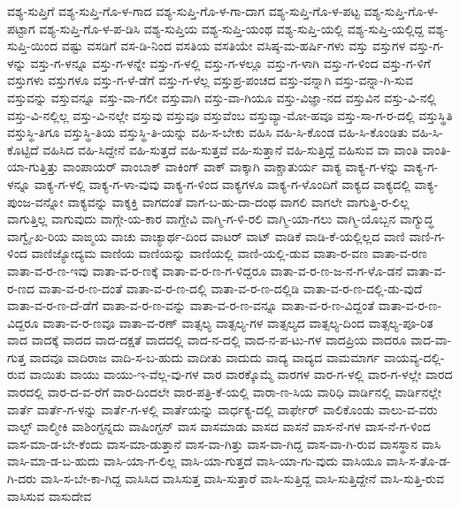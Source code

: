 {ವಶ್ಯ-ಸುಪ್ತಿಗೆ
ವಶ್ಯ-ಸುಪ್ತಿ-ಗೊ-ಳ-ಗಾದ
ವಶ್ಯ-ಸುಪ್ತಿ-ಗೊ-ಳ-ಗಾ-ದಾಗ
ವಶ್ಯ-ಸುಪ್ತಿ-ಗೊ-ಳ-ಪಟ್ಟ
ವಶ್ಯ-ಸುಪ್ತಿ-ಗೊ-ಳ-ಪಟ್ಟಾಗ
ವಶ್ಯ-ಸುಪ್ತಿ-ಗೊ-ಳ-ಪ-ಡಿಸಿ
ವಶ್ಯ-ಸುಪ್ತಿಯ
ವಶ್ಯ-ಸುಪ್ತಿ-ಯಂಥ
ವಶ್ಯ-ಸುಪ್ತಿ-ಯಲ್ಲಿ
ವಶ್ಯ-ಸುಪ್ತಿ-ಯಲ್ಲಿದ್ದ
ವಶ್ಯ-ಸುಪ್ತಿ-ಯಿಂದ
ವಷ್ಟು
ವಸಡಿಗೆ
ವಸ-ಡಿ-ನಿಂದ
ವಸತಿಯ
ವಸತಿಯೇ
ವಸಿಷ್ಠ-ಮ-ಹರ್ಷಿ-ಗಳು
ವಸ್ತು
ವಸ್ತುಗಳ
ವಸ್ತು-ಗ-ಳನ್ನು
ವಸ್ತು-ಗ-ಳನ್ನೂ
ವಸ್ತು-ಗ-ಳನ್ನೇ
ವಸ್ತು-ಗ-ಳಲ್ಲಿ
ವಸ್ತು-ಗ-ಳಲ್ಲೂ
ವಸ್ತು-ಗ-ಳಾಗಿ
ವಸ್ತು-ಗ-ಳಿಂದ
ವಸ್ತು-ಗ-ಳಿಗೆ
ವಸ್ತುಗಳು
ವಸ್ತುಗಳೂ
ವಸ್ತು-ಗ-ಳೆ-ಡೆಗೆ
ವಸ್ತು-ಗ-ಳೆಲ್ಲ
ವಸ್ತುಪ್ರ-ಪಂಚದ
ವಸ್ತು-ವನ್ನಾಗಿ
ವಸ್ತು-ವನ್ನಾ-ಗಿ-ಸುವ
ವಸ್ತುವನ್ನು
ವಸ್ತುವನ್ನೂ
ವಸ್ತು-ವಾ-ಗಲೀ
ವಸ್ತುವಾಗಿ
ವಸ್ತು-ವಾ-ಗಿಯೂ
ವಸ್ತು-ವಿಜ್ಞಾ-ನದ
ವಸ್ತುವಿನ
ವಸ್ತು-ವಿ-ನಲ್ಲಿ
ವಸ್ತು-ವಿ-ನಲ್ಲಿಲ್ಲ
ವಸ್ತು-ವಿ-ನಲ್ಲೇ
ವಸ್ತುವು
ವಸ್ತುವೂ
ವಸ್ತುವೆಂಬ
ವಸ್ತುವ್ಯಾ-ಮೋ-ಹವೂ
ವಸ್ತು-ಸಾ-ಗ-ರ-ದಲ್ಲಿ
ವಸ್ತುಸ್ಥಿತಿ
ವಸ್ತುಸ್ಥಿ-ತಿಗೂ
ವಸ್ತುಸ್ಥಿ-ತಿಯ
ವಸ್ತುಸ್ಥಿ-ತಿ-ಯನ್ನು
ವಹಿ-ಸ-ಬೇಕು
ವಹಿಸಿ
ವಹಿ-ಸಿ-ಕೊಂಡ
ವಹಿ-ಸಿ-ಕೊಂಡಿತು
ವಹಿ-ಸಿ-ಕೊಟ್ಟಿದೆ
ವಹಿಸಿದ
ವಹಿ-ಸಿದ್ದೇನೆ
ವಹಿ-ಸುತ್ತದೆ
ವಹಿ-ಸುತ್ತವೆ
ವಹಿ-ಸುತ್ತಾನೆ
ವಹಿ-ಸುತ್ತಿದ್ದೆ
ವಹಿಸುವ
ವಾ
ವಾಂತಿ
ವಾಂತಿ-ಯಾ-ಗುತ್ತಿತ್ತು
ವಾಂಪಾಯರ್
ವಾಂಬಾಕ್
ವಾಕಿಂಗ್
ವಾಕ್
ವಾಕ್ಕಾಗಿ
ವಾಕ್ಚಾತುರ್ಯ
ವಾಕ್ಯ
ವಾಕ್ಯ-ಗ-ಳನ್ನು
ವಾಕ್ಯ-ಗ-ಳನ್ನೂ
ವಾಕ್ಯ-ಗ-ಳಲ್ಲಿ
ವಾಕ್ಯ-ಗ-ಳಾ-ವುವು
ವಾಕ್ಯ-ಗ-ಳಿಂದ
ವಾಕ್ಯಗಳೂ
ವಾಕ್ಯ-ಗ-ಳೊಂದಿಗೆ
ವಾಕ್ಯದ
ವಾಕ್ಯದಲ್ಲಿ
ವಾಕ್ಯ-ಪುಂಜ-ವನ್ನೋ
ವಾಕ್ಯವನ್ನು
ವಾಕ್ಶಕ್ತಿ
ವಾಗದಂತೆ
ವಾಗ-ಬ-ಹು-ದಾ-ದಂಥ
ವಾಗಲಿ
ವಾಗಲೇ
ವಾಗುತ್ತಿ-ರ-ಲಿಲ್ಲ
ವಾಗುತ್ತಿಲ್ಲ
ವಾಗುವುದು
ವಾಗ್ಗೇ-ಯ-ಕಾರ
ವಾಗ್ದೇವಿ
ವಾಗ್ಮಿ-ಗ-ಳಿ-ರಲಿ
ವಾಗ್ಮಿ-ಯಾ-ಗಲು
ವಾಗ್ಮಿ-ಯೊಬ್ಬನ
ವಾಗ್ಯುದ್ಧ
ವಾಗ್ವೈ-ಖ-ರಿಯ
ವಾಙ್ಮಯ
ವಾಚು
ವಾಚ್ಯಾರ್ಥ-ದಿಂದ
ವಾಟರ್
ವಾಟ್
ವಾಡಿಕೆ
ವಾಡಿ-ಕೆ-ಯಲ್ಲಿಲ್ಲದ
ವಾಣಿ
ವಾಣಿ-ಗ-ಳಿಂದ
ವಾಣಿಜ್ಯೋದ್ಯಮ
ವಾಣಿಯ
ವಾಣಿಯನ್ನು
ವಾಣಿಯಲ್ಲಿ
ವಾಣಿ-ಯಲ್ಲಿ-ಡುವ
ವಾತಾ-ರ-ವಣ
ವಾತಾ-ವ-ರಣ
ವಾತಾ-ವ-ರ-ಣ-ಇವು
ವಾತಾ-ವ-ರ-ಣಕ್ಕೆ
ವಾತಾ-ವ-ರ-ಣ-ಗ-ಳಿದ್ದರೂ
ವಾತಾ-ವ-ರ-ಣ-ಜ-ನ-ಗ-ಳೊ-ಡನೆ
ವಾತಾ-ವ-ರ-ಣದ
ವಾತಾ-ವ-ರ-ಣ-ದಂತೆ
ವಾತಾ-ವ-ರ-ಣ-ದಲ್ಲಿ
ವಾತಾ-ವ-ರ-ಣ-ದಲ್ಲಿಡಿ
ವಾತಾ-ವ-ರ-ಣ-ದಲ್ಲಿ-ಡು-ವುದೆ
ವಾತಾ-ವ-ರ-ಣ-ದೆ-ಡೆಗೆ
ವಾತಾ-ವ-ರ-ಣ-ವನ್ನು
ವಾತಾ-ವ-ರ-ಣ-ವನ್ನೂ
ವಾತಾ-ವ-ರ-ಣ-ವಿದ್ದಂತೆ
ವಾತಾ-ವ-ರ-ಣ-ವಿದ್ದರೂ
ವಾತಾ-ವ-ರ-ಣವೂ
ವಾತಾ-ವ-ರಣ್
ವಾತ್ಸಲ್ಯ
ವಾತ್ಸಲ್ಯ-ಗಳ
ವಾತ್ಸಲ್ಯದ
ವಾತ್ಸಲ್ಯ-ದಿಂದ
ವಾತ್ಸಲ್ಯ-ಪೂ-ರಿತ
ವಾದ
ವಾದಕ್ಕೆ
ವಾದದ
ವಾದ-ದಕ್ಷತೆ
ವಾದದಲ್ಲಿ
ವಾದ-ನ-ದಲ್ಲಿ
ವಾದ-ನ-ಪ-ಟು-ಗಳ
ವಾದಪ್ರಿಯ
ವಾದರೂ
ವಾದ-ವಾ-ಗುತ್ತ
ವಾದವೂ
ವಾದಿರಾಜ
ವಾದಿ-ಸ-ಬ-ಹುದು
ವಾದೀತು
ವಾದುದು
ವಾದ್ಯ
ವಾದ್ಯದ
ವಾಮಮಾರ್ಗ
ವಾಯವ್ಯ-ದಲ್ಲಿ-ರುವ
ವಾಯಿತು
ವಾಯು
ವಾಯು-ಇ-ವೆಲ್ಲ-ವು-ಗಳ
ವಾರ
ವಾರಕ್ಕೊಮ್ಮೆ
ವಾರಗಳ
ವಾರ-ಗ-ಳಲ್ಲಿ
ವಾರ-ಗ-ಳಲ್ಲೇ
ವಾರದ
ವಾರದಲ್ಲಿ
ವಾರ-ದ-ವ-ರೆಗೆ
ವಾರ-ದಿಂದಲೇ
ವಾರ-ಪತ್ರಿ-ಕೆ-ಯಲ್ಲಿ
ವಾರಾ-ಣ-ಸಿಯ
ವಾರಿಧಿ
ವಾರ್ಡಿನಲ್ಲಿ
ವಾರ್ಡಿನಲ್ಲೇ
ವಾರ್ತೆ
ವಾರ್ತೆ-ಗ-ಳನ್ನು
ವಾರ್ತೆ-ಗ-ಳಲ್ಲಿ
ವಾರ್ತೆಯನ್ನು
ವಾರ್ಧಕ್ಯ-ದಲ್ಲಿ
ವಾರ್ಫೇರ್
ವಾಲಿಕೊಂಡು
ವಾಲು-ವ-ವರು
ವಾಲ್ಟ್
ವಾಲ್ಮೀಕಿ
ವಾಶಿಂಗ್ಟನ್ನದು
ವಾಷಿಂಗ್ಟನ್
ವಾಸ
ವಾಸಮಾಡು
ವಾಸದ
ವಾಸನೆ
ವಾಸ-ನೆ-ಗಳ
ವಾಸ-ನೆ-ಗ-ಳಿಂದ
ವಾಸ-ಮಾ-ಡ-ಬೇ-ಕೆಂದು
ವಾಸ-ಮಾ-ಡುತ್ತಾನೆ
ವಾಸ-ವಾ-ಗಿತ್ತು
ವಾಸ-ವಾ-ಗಿದ್ದ
ವಾಸ-ವಾ-ಗಿ-ರುವ
ವಾಸಸ್ಥಾನ
ವಾಸಿ
ವಾಸಿ-ಮಾ-ಡ-ಬ-ಹುದು
ವಾಸಿ-ಯಾ-ಗ-ಲಿಲ್ಲ
ವಾಸಿ-ಯಾ-ಗುತ್ತದೆ
ವಾಸಿ-ಯಾ-ಗು-ವುದು
ವಾಸಿಯೂ
ವಾಸಿ-ಸ-ತೊ-ಡ-ಗಿ-ದರು
ವಾಸಿ-ಸ-ಬೇ-ಕಾ-ಗಿದ್ದ
ವಾಸಿಸಿದ
ವಾಸಿಸುತ್ತ
ವಾಸಿ-ಸುತ್ತಾರೆ
ವಾಸಿ-ಸುತ್ತಿದ್ದ
ವಾಸಿ-ಸುತ್ತಿದ್ದೇನೆ
ವಾಸಿ-ಸುತ್ತಿ-ರುವ
ವಾಸಿಸುವ
ವಾಸುದೇವ
}
